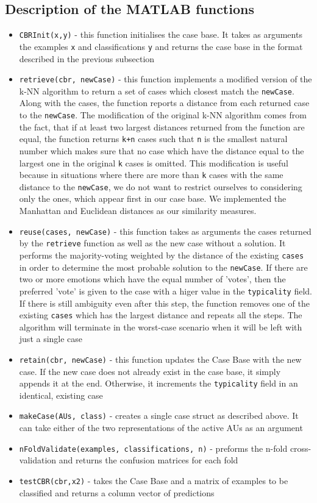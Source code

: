\documentclass[a4paper]{article}
\begin{document}
\subsection{Description of the MATLAB functions}
\begin{itemize}
\item \texttt{CBRInit(x,y)} - this function initialises the case base. It takes as arguments the examples \texttt{x} and classifications \texttt{y} and returns the case base in the format described in the previous subsection
\item \texttt{retrieve(cbr, newCase)} - this function implements a modified version of the k-NN algorithm to return a set of cases which closest match the \texttt{newCase}. Along with the cases, the function reports a distance from each returned case to the \texttt{newCase}. The modification of the original k-NN algorithm comes from the fact, that if at least two largest distances returned from the function are equal, the function returns \texttt{k+n} cases such that \texttt{n} is the smallest natural number which makes sure that no case which have the distance equal to the largest one in the original \texttt{k} cases is omitted. This modification is useful because in situations where there are more than \texttt{k} cases with the same distance to the \texttt{newCase}, we do not want to restrict ourselves to considering only the ones, which appear first in our case base. We implemented the Manhattan and Euclidean distances as our similarity measures.
\item \texttt{reuse(cases, newCase)} - this function takes as arguments the cases returned by the \texttt{retrieve} function as well as the new case without a solution. It performs the majority-voting weighted by the distance of the existing \texttt{cases} in order to determine the most probable solution to the \texttt{newCase}. If there are two or more emotions which have the equal number of 'votes', then the preferred 'vote' is given to the case with a higer value in the \texttt{typicality} field. If there is still ambiguity even after this step, the function removes one of the existing \texttt{cases} which has the largest distance and repeats all the steps. The algorithm will terminate in the worst-case scenario when it will be left with just a single case
\item \texttt{retain(cbr, newCase)} - this function updates the Case Base with the new case. If the new case does not already exist in the case base, it simply appends it at the end. Otherwise, it increments the \texttt{typicality} field in an identical, existing case
\item \texttt{makeCase(AUs, class)} - creates a single case struct as described above. It can take either of the two representations of the active AUs as an argument
\item \texttt{nFoldValidate(examples, classifications, n)} - preforms the n-fold cross-validation and returns the confusion matrices for each fold
\item \texttt{testCBR(cbr,x2)} - takes the Case Base and a matrix of examples to be classified and returns a column vector of predictions
\end{itemize}
\clearpage
\end{document}
